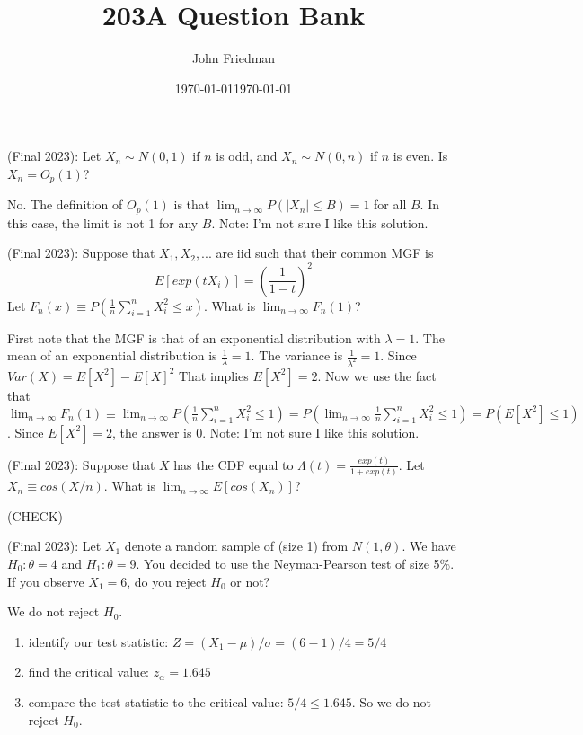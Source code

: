 \documentclass[answers]{exam}
\title{203A Question Bank}
\author{John Friedman}
\date{\today}
\date{\today}
\begin{document}
\maketitle

\begin{questions}

\question (Final 2023): Let $X_n \sim N(0,1)$ if $n$ is odd, and $X_n \sim N(0,n)$ if $n$ is even. Is $X_n = O_p(1)$?
\begin{solution}
    No. The definition of $O_p(1)$ is that $\lim_{n \to \infty} P(|X_n| \leq B) = 1$ for all $B$. In this case, the limit is not 1 for any $B$.
    Note: I'm not sure I like this solution.
\end{solution}

\question (Final 2023): Suppose that $X_1,X_2,...$ are iid such that their common MGF is 
$$E[exp(t X_i)] = (\frac{1}{1-t})^2$$
Let $F_n(x) \equiv P(\frac{1}{n} \sum_{i=1}^n X_i^2 \leq x)$. What is $\lim_{n \to \infty} F_n(1)$?
\begin{solution}
    First note that the MGF is that of an exponential distribution with $\lambda = 1$. The mean of an exponential distribution is $\frac{1}{\lambda} = 1$. The variance is $\frac{1}{\lambda^2} = 1$. Since $Var(X) = E[X^2] - E[X]^2$ That implies $E[X^2] = 2$. Now we use the fact that 
    $\lim_{n \to \infty} F_n(1) \equiv \lim_{n \to \infty}  P(\frac{1}{n} \sum_{i=1}^n X_i^2 \leq 1) = P(\lim_{n \to \infty} \frac{1}{n} \sum_{i=1}^n X_i^2 \leq 1) = P(E[X^2] \leq 1)$. Since $E[X^2] = 2$, the answer is 0.
    Note: I'm not sure I like this solution.
    \end{solution}

\question (Final 2023): Suppose that $X$ has the CDF equal to $\Lambda(t) = \frac{exp(t)}{1+exp(t)}$. Let $X_n \equiv cos(X/n)$. What is $\lim_{n \to \infty} E[cos(X_n)]$?
\begin{solution}
    (CHECK)
\end{solution}

\question (Final 2023): Let $X_1$ denote a random sample of (size 1) from $N(1,\theta)$. We have $H_0 : \theta = 4$ and $H_1 : \theta = 9$. You decided to use the Neyman-Pearson test of size 5\%. If you observe $X_1=6$, do you reject $H_0$ or not?
\begin{solution}
    We do not reject $H_0$.
    \begin{enumerate}
        \item  identify our test statistic: $ Z = (X_1 - \mu)/\sigma = (6-1)/4 = 5/4$
        \item  find the critical value: $z_{\alpha} = 1.645$
        \item  compare the test statistic to the critical value: $5/4 \le 1.645$. So we do not reject $H_0$.
    \end{enumerate}


\end{solution}
\end{questions}
\end{document}
